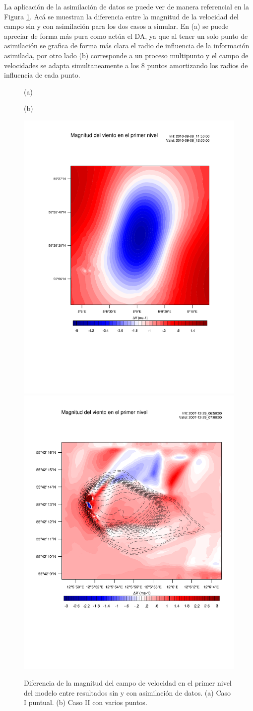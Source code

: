 La aplicación de la asimilación de datos se puede ver de manera referencial en la Figura \ref{fig:05_da_expl}. Acá se muestran la diferencia entre la magnitud de la velocidad del campo sin y con asimilación para los dos casos a simular. En (a) se puede apreciar de forma más pura como actúa el DA, ya que al tener un solo punto de asimilación se grafica de forma más clara el radio de influencia de la información asimilada, por otro lado (b) corresponde a un proceso multipunto y el campo de velocidades se adapta simultaneamente a los 8 puntos amortizando los radios de influencia de cada punto.
\begin{figure}[H]
	\centering
	\begin{minipage}{0.5\linewidth}
		\center\hspace{0.3cm}(a)
	\end{minipage}%
	\begin{minipage}{0.5\linewidth}
		\center\hspace{0.3cm}(b)
	\end{minipage}%
	
	\includegraphics[width=0.5\linewidth,page=1,trim={2.5cm 6.2cm 1cm 4.5cm},clip]{Imagenes/05/eta1_da_hov}%
	\includegraphics[width=0.5\linewidth,page=1,trim={1.0cm 5.2cm 1cm 4.5cm},clip]{Imagenes/05/eta1_da_bol}%
	\caption{Diferencia de la magnitud del campo de velocidad en el primer nivel del modelo entre resultados sin y con asimilación de datos. (a) Caso I puntual. (b) Caso II con varios puntos.}
	\label{fig:05_da_expl}
\end{figure}
\newpage
